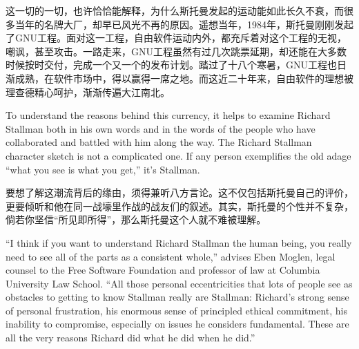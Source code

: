 \ifdefined\chs
这一切的一切，也许恰恰能解释，为什么斯托曼发起的运动能如此长久不衰，而很多当年的名牌大厂，却早已风光不再的原因。遥想当年，1984年，斯托曼刚刚发起了GNU工程。面对这一工程，自由软件运动内外，都充斥着对这个工程的无视，嘲讽，甚至攻击。一路走来，GNU工程虽然有过几次跳票延期，却还能在大多数时候按时交付，完成一个又一个的发布计划。踏过了十八个寒暑，GNU工程也日渐成熟，在软件市场中，得以赢得一席之地。而这近二十年来，自由软件的理想被理查德精心呵护，渐渐传遍大江南北。
\fi

\ifdefined\eng
To understand the reasons behind this currency, it helps to examine Richard Stallman both in his own words and in the words of the people who have collaborated and battled with him along the way. The Richard Stallman character sketch is not a complicated one. If any person exemplifies the old adage ``what you see is what you get,'' it's Stallman.
\fi

\ifdefined\chs
要想了解这潮流背后的缘由，须得兼听八方言论。这不仅包括斯托曼自己的评价，更要倾听和他在同一战壕里作战的战友们的叙述。其实，斯托曼的个性并不复杂，倘若你坚信“所见即所得”，那么斯托曼这个人就不难被理解。
\fi

\ifdefined\eng
``I think if you want to understand Richard Stallman the human being, you really need to see all of the parts as a consistent whole,'' advises Eben Moglen, legal counsel to the Free Software Foundation and professor of law at Columbia University Law School. ``All those personal eccentricities that lots of people see as obstacles to getting to know Stallman really are Stallman: Richard's strong sense of personal frustration, his enormous sense of principled ethical commitment, his inability to compromise, especially on issues he considers fundamental. These are all the very reasons Richard did what he did when he did.''
\fi

